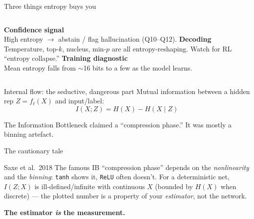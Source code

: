 \documentclass[aspectratio=169,11pt]{beamer}
\begin{document}
\begin{frame}{Three things entropy buys you}
\begin{columns}[T]
\textbf{Confidence signal}\\[4pt]
High entropy $\to$ abstain / flag hallucination (Q10--Q12).
\textbf{Decoding}\\[4pt]
Temperature, top-$k$, nucleus, min-$p$ are all entropy-reshaping.
Watch for RL ``entropy collapse.''
\textbf{Training diagnostic}\\[4pt]
Mean entropy falls from $\sim$16 bits to a few as the model learns.
\end{columns}
\end{frame}

\begin{frame}{Internal flow: the seductive, dangerous part}
Mutual information between a hidden rep $Z=f_\ell(X)$ and input/label:
\[
  I(X;Z) = H(X)-H(X\mid Z)
\]
\begin{center}
\end{center}
The Information Bottleneck claimed a ``compression phase.'' \alert{It was mostly a binning artefact.}
\end{frame}

\begin{frame}{The cautionary tale}
\begin{alertblock}{Saxe et al.\ 2018}
The famous IB ``compression phase'' depends on the \emph{nonlinearity} and the
\emph{binning}: \texttt{tanh} shows it, \texttt{ReLU} often doesn't.
For a deterministic net, $I(Z;X)$ is ill-defined/infinite with continuous $X$ (bounded
by $H(X)$ when discrete) --- the plotted number is a property of your \emph{estimator},
not the network.
\end{alertblock}
\centering\color{Accent}\textbf{The estimator \emph{is} the measurement.}
\end{frame}
\end{document}
